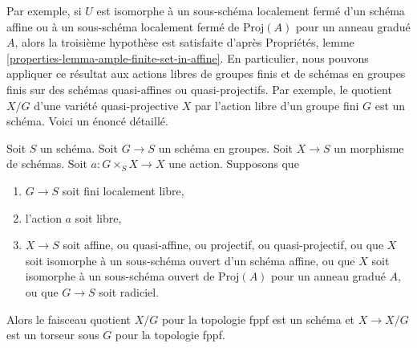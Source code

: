 \noindent
Par exemple, si $U$ est isomorphe à un sous-schéma localement fermé d'un
schéma affine ou à un sous-schéma localement fermé de
$\text{Proj}(A)$ pour un anneau gradué $A$, alors la troisième hypothèse est satisfaite d'après
Propriétés, lemme \ref{properties-lemma-ample-finite-set-in-affine}.
En particulier, nous pouvons appliquer ce résultat aux actions libres de groupes finis et de
schémas en groupes finis sur des schémas quasi-affines ou quasi-projectifs.
Par exemple, le quotient $X/G$ d'une variété quasi-projective
$X$ par l'action libre d'un groupe fini $G$ est un schéma. Voici un
énoncé détaillé.

\begin{lemma}
\label{lemma-quotient-scheme}
Soit $S$ un schéma. Soit $G \to S$ un schéma en groupes. Soit $X \to S$ un
morphisme de schémas. Soit $a : G \times_S X \to X$ une action. Supposons que
\begin{enumerate}
\item $G \to S$ soit fini localement libre,
\item l'action $a$ soit libre,
\item $X \to S$ soit affine, ou quasi-affine, ou projectif, ou
quasi-projectif, ou que $X$ soit isomorphe à un sous-schéma ouvert d'un
schéma affine, ou que $X$ soit isomorphe à un sous-schéma ouvert de $\text{Proj}(A)$
pour un anneau gradué $A$, ou que $G \to S$ soit radiciel.
\end{enumerate}
Alors le faisceau quotient $X/G$ pour la topologie fppf est un schéma et $X \to X/G$
est un torseur sous $G$ pour la topologie fppf.
\end{lemma}

